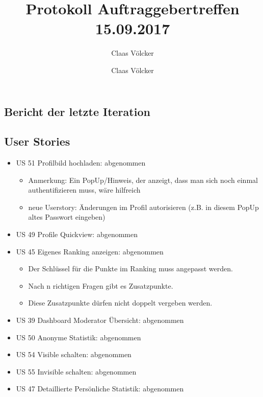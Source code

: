 \documentclass[colorback, accentcolor=tud1c, paper=a4]{tudexercise}
\title{Protokoll Auftraggebertreffen 15.09.2017}
\subtitle{Claas Völcker}
\author{Claas Völcker}
\begin{document}
\maketitle

\begin{multicols}{2}

\section*{Bericht der letzte Iteration}
\subsection*{User Stories}
\begin{itemize}
	\item US 51 Profilbild hochladen: abgenommen
	\begin{itemize}
		\item Anmerkung: Ein PopUp/Hinweis, der anzeigt, dass man sich noch einmal authentifizieren muss, wäre hilfreich
		\item neue Userstory: Änderungen im Profil autorisieren (z.B. in diesem PopUp altes Passwort eingeben)
	\end{itemize}
	\item US 49 Profile Quickview: abgenommen
	\item US 45 Eigenes Ranking anzeigen: abgenommen
	\begin{itemize}
		\item Der Schlüssel für die Punkte im Ranking muss angepasst werden.
		\item Nach n richtigen Fragen gibt es Zusatzpunkte.
		\item Diese Zusatzpunkte dürfen nicht doppelt vergeben werden. 
	\end{itemize}
	\item US 39 Dashboard Moderator Übersicht: abgenommen
	\item US 50 Anonyme Statistik: abgenommen
	\item US 54 Visible schalten: abgenommen
	\item US 55 Invisible schalten: abgenommen
	\item US 47 Detaillierte Persönliche Statistik: abgenommen
\end{itemize}



\end{multicols}
\end{document}
